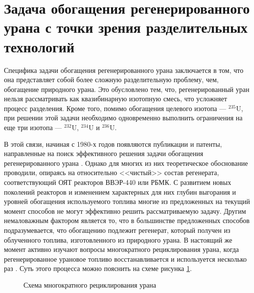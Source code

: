 
\section{Задача обогащения регенерированного урана с точки зрения разделительных технологий}

Специфика задачи обогащения регенерированного урана заключается в том, что она представляет собой более сложную разделительную проблему, чем, обогащение  природного урана.
Это обусловлено тем, что, регенерированный уран нельзя рассматривать как квазибинарную изотопную смесь, что усложняет процесс разделения. Кроме того, помимо обогащения целевого изотопа --- $^{235}$U, при решении этой задачи необходимо одновременно выполнить ограничения на еще три изотопа --- $^{232}$U, $^{234}$U и $^{236}$U.

В этой связи, начиная с 1980-х годов появляются публикации и патенты, направленные на поиск эффективного решения задачи обогащения регенерированного урана \cite{ksenof88,borodynyaIssledovanieProblemyVovlecheniya1989,smirnovKaskadnyeShemyZadachah2012,sulaberidzeNekotoryhRazdelitelnyhProblemah2004,kazukihidaSimultaneousEvaluationEffects1986,sidenkoIssledovanieKaskadnyhShem,2024smirnovObogashchenieRegenerirovannogoUrana2018,prusakovKorrekciyaIzotopnogoSostava2008}. Однако для многих из них теоретическое обоснование проводили, опираясь на относительно <<чистый>> состав регенерата, соответствующий ОЯТ реакторов ВВЭР-440 или РБМК. С развитием новых поколений реакторов и изменением характерных для них глубин выгорания и уровней обогащения используемого топлива многие из предложенных на текущий момент способов не могут эффективно решить рассматриваемую задачу.
Другим немаловажным фактором является то, что в большинстве предложенных способов подразумевается, что обогащению подлежит регенерат, который получен из облученного топлива, изготовленного из природного урана. В настоящий же момент активно изучают вопросы многократного рециклирования урана, когда регенерированное урановое топливо восстанавливается и используется несколько раз \cite{rodionovaAnalizTehnikoekonomicheskihHarakteristik2019,smirnovFizikotehnicheskieProblemyObogashcheniya2020}. Суть этого процесса можно пояснить на схеме рисунка \ref{recycle}.

\begin{figure}[ht]
  \caption{Схема многократного рециклирования урана}\label{recycle}
\end{figure}

